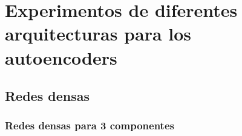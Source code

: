 
\chapter{Experimentos de diferentes arquitecturas para los autoencoders} %

\label{AppendixA} %

\section{Redes densas}

\subsection{Redes densas para 3 componentes}

